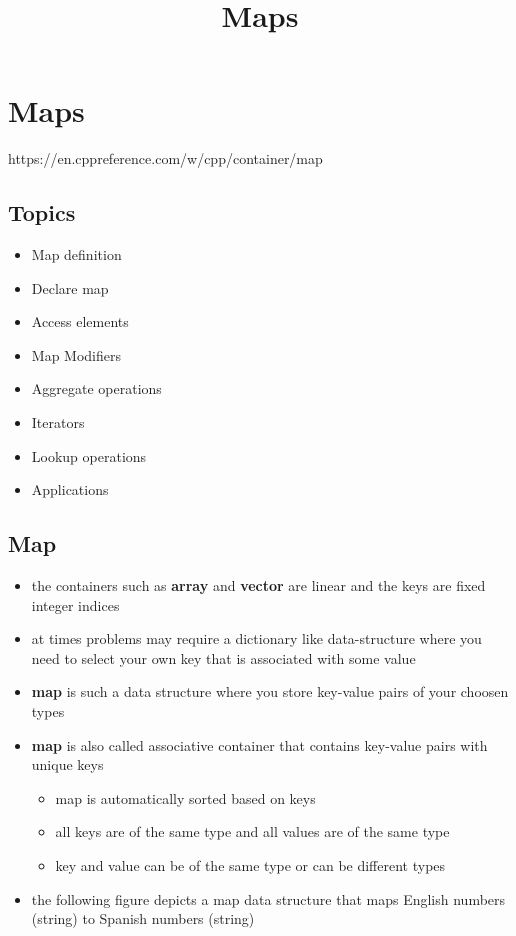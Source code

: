 \documentclass[11pt]{article}
\title{Maps}
\providecommand{\tightlist}{%
      \setlength{\itemsep}{0pt}\setlength{\parskip}{0pt}}
\begin{document}
    
    \maketitle
    
    

    
    \hypertarget{maps}{%
\section{Maps}\label{maps}}

https://en.cppreference.com/w/cpp/container/map

\hypertarget{topics}{%
\subsection{Topics}\label{topics}}

\begin{itemize}
\tightlist
\item
  Map definition
\item
  Declare map
\item
  Access elements
\item
  Map Modifiers
\item
  Aggregate operations
\item
  Iterators
\item
  Lookup operations
\item
  Applications
\end{itemize}

    \hypertarget{map}{%
\subsection{Map}\label{map}}

\begin{itemize}
\tightlist
\item
  the containers such as \textbf{array} and \textbf{vector} are linear
  and the keys are fixed integer indices
\item
  at times problems may require a dictionary like data-structure where
  you need to select your own key that is associated with some value
\item
  \textbf{map} is such a data structure where you store key-value pairs
  of your choosen types
\item
  \textbf{map} is also called associative container that contains
  key-value pairs with unique keys

  \begin{itemize}
  \tightlist
  \item
    map is automatically sorted based on keys
  \item
    all keys are of the same type and all values are of the same type
  \item
    key and value can be of the same type or can be different types
  \end{itemize}
\item
  the following figure depicts a map data structure that maps English
  numbers (string) to Spanish numbers (string)
\end{itemize}
\end{document}
